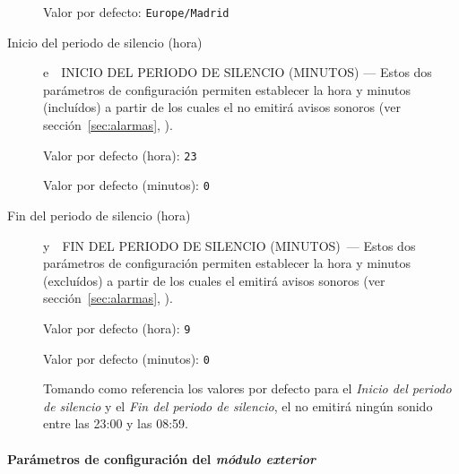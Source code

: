 \begin{description}
  Valor por defecto: \texttt{Europe/Madrid}

  \item[Inicio del periodo de silencio (hora)] e~~{\color{main}\uppercase{Inicio del periodo de silencio (minutos)}} --- Estos dos parámetros de configuración permiten establecer la hora y minutos (incluídos) a partir de los cuales el \CMS no emitirá avisos sonoros (ver sección~\ref{sec:alarmas}, \textit{}). 
  
  
  Valor por defecto (hora): \texttt{23}
  
  Valor por defecto (minutos): \texttt{0}
  
  \item[Fin del periodo de silencio (hora)] y~~{\color{main}\uppercase{Fin del periodo de silencio (minutos)}}~--- Estos dos parámetros de configuración permiten establecer la hora y minutos (excluídos) a partir de los cuales el \CMS emitirá avisos sonoros (ver sección~\ref{sec:alarmas}, \textit{}).
  
  Valor por defecto (hora): \texttt{9}
  
  Valor por defecto (minutos): \texttt{0}
  
  Tomando como referencia los valores por defecto para el \emph{Inicio del periodo de silencio} y el \emph{Fin del periodo de silencio}, el \CMS no emitirá ningún sonido entre las 23:00 y las 08:59.
  \attend
\end{description}

\paragraph{Parámetros de configuración del \textit{módulo exterior}}
\label{sec:params-exterior}

